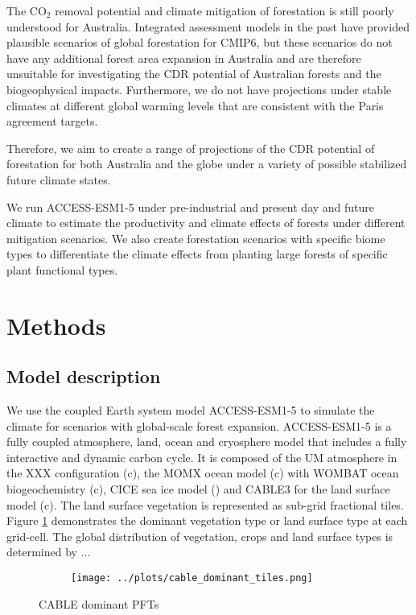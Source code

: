 \documentclass[]{article}
\begin{document}

The CO$_2$ removal potential and climate mitigation of forestation is still poorly understood for Australia.
Integrated assessment models in the past have provided plausible scenarios of global forestation for CMIP6, but these scenarios do not have any additional forest area expansion in Australia \parencite{loughran_limited_2023} and are therefore unsuitable for investigating the CDR potential of Australian forests and the biogeophysical impacts.
Furthermore, we do not have projections under stable climates at different global warming levels that are consistent with the Paris agreement targets.

Therefore, we aim to create a range of projections of the CDR potential of forestation for both Australia and the globe under a variety of possible stabilized future climate states.

We run ACCESS-ESM1-5 under pre-industrial and present day and future climate to estimate the productivity and climate effects of forests under different mitigation scenarios.
We also create forestation scenarios with specific biome types to differentiate the climate effects from planting large forests of specific plant functional types.

\section{Methods}

\subsection{Model description}

We use the coupled Earth system model ACCESS-ESM1-5 to simulate the climate for scenarios with global-scale forest expansion.
ACCESS-ESM1-5 is a fully coupled atmosphere, land, ocean and cryosphere model that includes a fully interactive and dynamic carbon cycle.
It is composed of the UM atmosphere in the XXX configuration (c), the MOMX ocean model (c) with WOMBAT ocean biogeochemistry (c), CICE sea ice model () and CABLE3 for the land surface model (c).
The land surface vegetation is represented as sub-grid fractional tiles.
Figure \ref{fig:dominant_pfts} demonstrates the dominant vegetation type or land surface type at each grid-cell.
The global distribution of vegetation, crops and land surface types is determined by ...


\begin{figure}[H]
    \begin{subfigure}[b]{\linewidth}
        \centering
        \texttt{[image: ../plots/cable\_dominant\_tiles.png]}
    \end{subfigure}
    \caption{CABLE dominant PFTs}
    \label{fig:dominant_pfts}
\end{figure}
\end{document}

